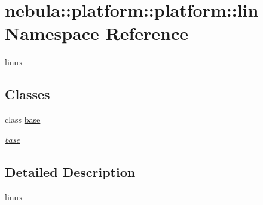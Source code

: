 \hypertarget{namespacenebula_1_1platform_1_1platform_1_1lin}{
\section{nebula::platform::platform::lin Namespace Reference}
\label{namespacenebula_1_1platform_1_1platform_1_1lin}
}


linux  
\subsection*{Classes}
\begin{DoxyCompactItemize}
\item 
class \hyperlink{classnebula_1_1platform_1_1platform_1_1lin_1_1base}{base}
\begin{DoxyCompactList}\small\item\em \hyperlink{classnebula_1_1platform_1_1platform_1_1lin_1_1base}{base} \item\end{DoxyCompactList}\end{DoxyCompactItemize}


\subsection{Detailed Description}
linux 